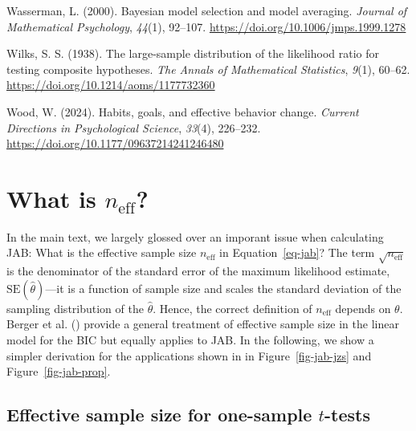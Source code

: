 \documentclass[
  man,
  floatsintext,
  longtable,
  nolmodern,
  notxfonts,
  notimes,
  colorlinks=true,linkcolor=blue,citecolor=blue,urlcolor=blue]{apa7}
\newlength{\cslhangindent}
\newenvironment{CSLReferences}[2] %
 {\begin{list}{}{%
  \setlength{\itemindent}{0pt}
  \setlength{\leftmargin}{0pt}
  \setlength{\parsep}{0pt}
  \ifodd #1
   \setlength{\leftmargin}{\cslhangindent}
   \setlength{\itemindent}{-1\cslhangindent}
  \fi
  \setlength{\itemsep}{#2\baselineskip}}}
 {\end{list}}
\begin{document}
\begin{CSLReferences}{1}{0}
Wasserman, L. (2000). Bayesian model selection and model averaging.
\emph{Journal of Mathematical Psychology}, \emph{44}(1), 92--107.
\url{https://doi.org/10.1006/jmps.1999.1278}

Wilks, S. S. (1938). The large-sample distribution of the likelihood
ratio for testing composite hypotheses. \emph{The Annals of Mathematical
Statistics}, \emph{9}(1), 60--62.
\url{https://doi.org/10.1214/aoms/1177732360}

Wood, W. (2024). Habits, goals, and effective behavior change.
\emph{Current Directions in Psychological Science}, \emph{33}(4),
226--232. \url{https://doi.org/10.1177/09637214241246480}

\end{CSLReferences}

\clearpage

\appendix

\section{\texorpdfstring{What is
\(n_\text{eff}\)?}{What is n\_\textbackslash text\{eff\}?}}\label{sec-appendix-n-eff}

In the main text, we largely glossed over an imporant issue when
calculating JAB: What is the effective sample size \(n_\text{eff}\) in
Equation~\ref{eq-jab}? The term \(\sqrt{n_\text{eff}}\) is the
denominator of the standard error of the maximum likelihood estimate,
\(\text{SE}(\hat \theta)\)---it is a function of sample size and scales
the standard deviation of the sampling distribution of the
\(\hat \theta\). Hence, the correct definition of \(n_\text{eff}\)
depends on \(\theta\). Berger et al. ()
provide a general treatment of effective sample size in the linear model
for the BIC but equally applies to JAB. In the following, we show a
simpler derivation for the applications shown in in
Figure~\ref{fig-jab-jzs} and Figure~\ref{fig-jab-prop}.

\subsection{\texorpdfstring{Effective sample size for one-sample
\(t\)-tests}{Effective sample size for one-sample t-tests}}\label{effective-sample-size-for-one-sample-t-tests}
\end{document}
